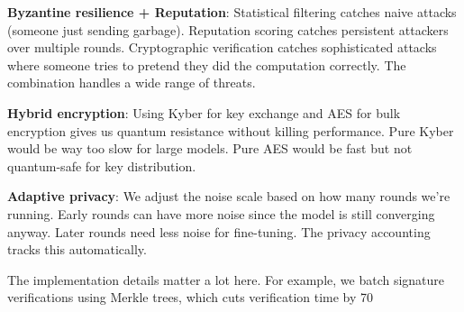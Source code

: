 \documentclass[journal,onecolumn]{IEEEtran}
\begin{document}
\textbf{Byzantine resilience + Reputation}: Statistical filtering catches naive attacks (someone just sending garbage). Reputation scoring catches persistent attackers over multiple rounds. Cryptographic verification catches sophisticated attacks where someone tries to pretend they did the computation correctly. The combination handles a wide range of threats.

\textbf{Hybrid encryption}: Using Kyber for key exchange and AES for bulk encryption gives us quantum resistance without killing performance. Pure Kyber would be way too slow for large models. Pure AES would be fast but not quantum-safe for key distribution.

\textbf{Adaptive privacy}: We adjust the noise scale based on how many rounds we're running. Early rounds can have more noise since the model is still converging anyway. Later rounds need less noise for fine-tuning. The privacy accounting tracks this automatically.

The implementation details matter a lot here. For example, we batch signature verifications using Merkle trees, which cuts verification time by 70%
\end{document}
